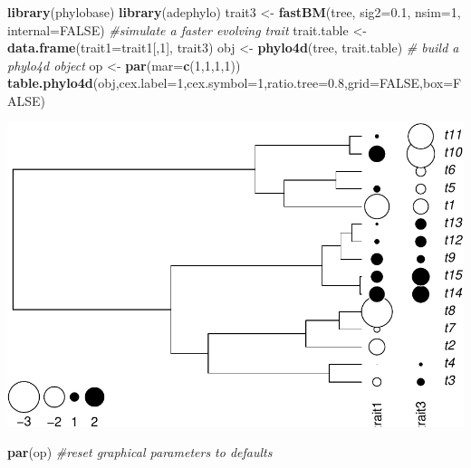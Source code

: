 \documentclass[
]{book}
\newenvironment{Shaded}{\begin{snugshade}}{\end{snugshade}}
\newcommand{\AttributeTok}[1]{\textcolor[rgb]{0.13,0.29,0.53}{#1}}
\newcommand{\CommentTok}[1]{\textcolor[rgb]{0.56,0.35,0.01}{\textit{#1}}}
\newcommand{\ConstantTok}[1]{\textcolor[rgb]{0.56,0.35,0.01}{#1}}
\newcommand{\DecValTok}[1]{\textcolor[rgb]{0.00,0.00,0.81}{#1}}
\newcommand{\FloatTok}[1]{\textcolor[rgb]{0.00,0.00,0.81}{#1}}
\newcommand{\FunctionTok}[1]{\textcolor[rgb]{0.13,0.29,0.53}{\textbf{#1}}}
\newcommand{\NormalTok}[1]{#1}
\newcommand{\OtherTok}[1]{\textcolor[rgb]{0.56,0.35,0.01}{#1}}
\begin{document}
\begin{Shaded}
\begin{Highlighting}[]
\FunctionTok{library}\NormalTok{(phylobase)}
\FunctionTok{library}\NormalTok{(adephylo)}
\NormalTok{trait3 }\OtherTok{\textless{}{-}} \FunctionTok{fastBM}\NormalTok{(tree, }\AttributeTok{sig2=}\FloatTok{0.1}\NormalTok{, }\AttributeTok{nsim=}\DecValTok{1}\NormalTok{, }\AttributeTok{internal=}\ConstantTok{FALSE}\NormalTok{) }\CommentTok{\#simulate a faster evolving trait}
\NormalTok{trait.table }\OtherTok{\textless{}{-}} \FunctionTok{data.frame}\NormalTok{(}\AttributeTok{trait1=}\NormalTok{trait1[,}\DecValTok{1}\NormalTok{], trait3)}
\NormalTok{obj }\OtherTok{\textless{}{-}} \FunctionTok{phylo4d}\NormalTok{(tree, trait.table) }\CommentTok{\# build a phylo4d object}
\NormalTok{op }\OtherTok{\textless{}{-}} \FunctionTok{par}\NormalTok{(}\AttributeTok{mar=}\FunctionTok{c}\NormalTok{(}\DecValTok{1}\NormalTok{,}\DecValTok{1}\NormalTok{,}\DecValTok{1}\NormalTok{,}\DecValTok{1}\NormalTok{))}
\FunctionTok{table.phylo4d}\NormalTok{(obj,}\AttributeTok{cex.label=}\DecValTok{1}\NormalTok{,}\AttributeTok{cex.symbol=}\DecValTok{1}\NormalTok{,}\AttributeTok{ratio.tree=}\FloatTok{0.8}\NormalTok{,}\AttributeTok{grid=}\ConstantTok{FALSE}\NormalTok{,}\AttributeTok{box=}\ConstantTok{FALSE}\NormalTok{)}
\end{Highlighting}
\end{Shaded}

\includegraphics{pcm-workshop_files/figure-latex/Plot continuous parameter - table.phylo4d-1.pdf}

\begin{Shaded}
\begin{Highlighting}[]
\FunctionTok{par}\NormalTok{(op) }\CommentTok{\#reset graphical parameters to defaults}
\end{Highlighting}
\end{Shaded}
\end{document}
